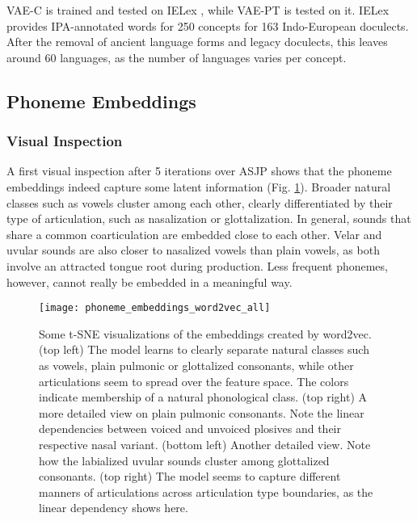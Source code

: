 \documentclass[6pt]{article}
\begin{document}
VAE-C is trained and tested on IELex \citep{dunn2012indo}, while VAE-PT is tested on it. IELex provides IPA-annotated words for 250 concepts for 163 Indo-European doculects. After the removal of ancient language forms and legacy doculects, this leaves around 60 languages, as the number of languages varies per concept.
\subsection{Phoneme Embeddings}
\subsubsection{Visual Inspection}
A first visual inspection after 5 iterations over ASJP shows that the phoneme embeddings indeed capture some latent information (Fig.  \ref{fig:phoneme_embeddings_word2vec_all}). Broader natural classes such as vowels cluster among each other,  clearly differentiated by their type of articulation, such as nasalization or glottalization. In general, sounds that share a common coarticulation are embedded close to each other. Velar and uvular sounds are also closer to nasalized vowels than plain vowels, as both involve an attracted tongue root during production. Less frequent phonemes, however, cannot really be embedded in a meaningful way.

\begin{figure}[h!] %
   \centering
   \texttt{[image: phoneme\_embeddings\_word2vec\_all]} 
   \caption{Some t-SNE visualizations of the embeddings created by word2vec. (top left) The model learns to clearly separate natural classes such as vowels, plain pulmonic or glottalized consonants, while other articulations seem to spread over the feature space. The colors indicate membership of a natural phonological class.  (top right) A more detailed view on plain pulmonic consonants. Note the linear dependencies between voiced and unvoiced plosives and their respective nasal variant. (bottom left) Another detailed view. Note how the labialized uvular sounds cluster among glottalized consonants. (top right) The model seems to capture different manners of articulations across articulation type boundaries, as the linear dependency shows here.}
   \label{fig:phoneme_embeddings_word2vec_all}
\end{figure}
\end{document}
